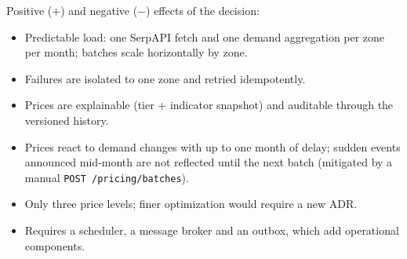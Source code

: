 \documentclass[11pt,a4paper]{article}
\begin{document}
\begin{description}[style=nextline]
  \item[Consequences]
  Positive ($+$) and negative ($-$) effects of the decision:
  \begin{itemize}
    \item[+] Predictable load: one SerpAPI fetch and one demand aggregation
      per zone per month; batches scale horizontally by zone.
    \item[+] Failures are isolated to one zone and retried idempotently.
    \item[+] Prices are explainable (tier + indicator snapshot) and auditable
      through the versioned history.
    \item[$-$] Prices react to demand changes with up to one month of delay;
      sudden events announced mid-month are not reflected until the next
      batch (mitigated by a manual \texttt{POST /pricing/batches}).
    \item[$-$] Only three price levels; finer optimization would require a
      new ADR.
    \item[$-$] Requires a scheduler, a message broker and an outbox, which
      add operational components.
  \end{itemize}
\end{description}
\end{document}
